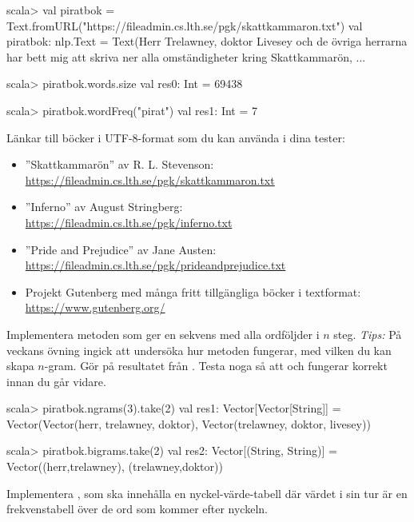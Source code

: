 \begin{REPL}[basicstyle=\color{white}\ttfamily\fontsize{9}{11}\selectfont]
scala> val piratbok = Text.fromURL("https://fileadmin.cs.lth.se/pgk/skattkammaron.txt")
val piratbok: nlp.Text = Text(Herr Trelawney, doktor Livesey och de övriga herrarna har bett mig att skriva ner alla omständigheter kring Skattkammarön, ...

scala> piratbok.words.size
val res0: Int = 69438

scala> piratbok.wordFreq("pirat")
val res1: Int = 7
\end{REPL}
Länkar till böcker i UTF-8-format som du kan använda i dina tester:
\begin{itemize}%
\item ''Skattkammarön'' av R. L. Stevenson: \\\url{https://fileadmin.cs.lth.se/pgk/skattkammaron.txt}
\item ''Inferno'' av August Stringberg: \\\url{https://fileadmin.cs.lth.se/pgk/inferno.txt}
\item ''Pride and Prejudice'' av Jane Austen: \\\url{https://fileadmin.cs.lth.se/pgk/prideandprejudice.txt}
\item Projekt Gutenberg med många fritt tillgängliga böcker i textformat: \\\url{https://www.gutenberg.org/}
\end{itemize}






\Task Implementera metoden  som ger en sekvens med alla ordföljder i $n$ steg. \emph{Tips:} På veckans övning ingick att undersöka hur metoden  fungerar, med vilken du kan skapa $n$-gram. Gör  på resultatet från . Testa noga så att  och  fungerar korrekt innan du går vidare.
\begin{REPL}
scala> piratbok.ngrams(3).take(2)
val res1: Vector[Vector[String]] =
  Vector(Vector(herr, trelawney, doktor), Vector(trelawney, doktor, livesey))

scala> piratbok.bigrams.take(2)
val res2: Vector[(String, String)] =
  Vector((herr,trelawney), (trelawney,doktor))
\end{REPL}

\Task Implementera , som ska innehålla en nyckel-värde-tabell där värdet i sin tur är en frekvenstabell över de ord som kommer efter nyckeln.

